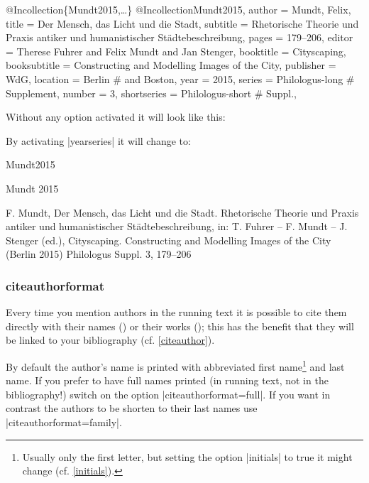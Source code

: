 \documentclass[a4paper,
10pt,
greek,
french,
spanish,
italian,
ngerman,
english
]{ltxdoc}
\begin{document}
\begin{bibexample}[label=Mundt2015]{{@}Incollection\{Mundt2015,…\}}
@Incollection{Mundt2015,
  author       = {Mundt, Felix},
  title        = {Der Mensch, das Licht und die Stadt},
  subtitle     = {Rhetorische Theorie und Praxis antiker und humanistischer Städtebeschreibung},
  pages        = {179--206},
  editor       = {Therese Fuhrer and Felix Mundt and Jan Stenger},
  booktitle    = {Cityscaping},
  booksubtitle = {Constructing and Modelling Images of the City},
  publisher    = WdG,
  location     = Berlin #{ and Boston}, %
  year         = {2015},
  series       = Philologus-long #{ Supplement},
  number       = {3},
  shortseries  = Philologus-short #{ Suppl.},
}
\end{bibexample}

Without any option activated it will look like this:
 
By activating |yearseries| it will change to:
\begin{bibbox}{Mundt2015}\footnotesize
\parbox[t]{1.7cm}{Mundt 2015} \parbox[t]{9cm}{F. Mundt, Der Mensch, das Licht und die Stadt. Rhetorische Theorie und Praxis antiker und humanistischer Städtebeschreibung, in: T. Fuhrer -- F. Mundt -- J. Stenger (ed.), Cityscaping. Constructing and Modelling Images of the City (Berlin 2015) {\color{red}Philologus Suppl. 3,} 179–206}
\end{bibbox}

\subsubsection{citeauthorformat}\label{citeauthorformat}
Every time you mention authors in the running text it is possible to cite them 
directly with their names () or their works  ();
this has the benefit that they will be linked to your bibliography (cf. \cref{citeauthor}).

By default the author's name is printed with abbreviated first name\footnote{Usually only the first letter, but setting the option |initials| to true it might change (cf. \cref{initials}).} and last name.
If you prefer to have full names printed (in running text, not in the bibliography!) switch on the option |citeauthorformat=full|.
If you want in contrast the authors to be shorten to their last names use |citeauthorformat=family|.
\end{document}
